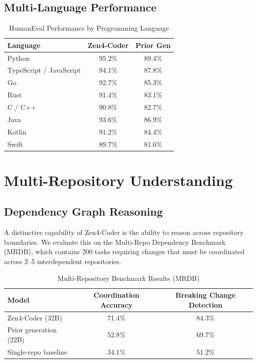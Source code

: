 \documentclass[11pt,a4paper]{article}
\begin{document}
\subsection{Multi-Language Performance}

\begin{table}[H]
\centering
\caption{HumanEval Performance by Programming Language}
\begin{tabular}{lcc}
\toprule
\textbf{Language} & \textbf{Zen4-Coder} & \textbf{Prior Gen} \\
\midrule
Python & 95.2\% & 89.4\% \\
TypeScript / JavaScript & 94.1\% & 87.8\% \\
Go & 92.7\% & 85.3\% \\
Rust & 91.4\% & 83.1\% \\
C / C++ & 90.8\% & 82.7\% \\
Java & 93.6\% & 86.9\% \\
Kotlin & 91.2\% & 84.4\% \\
Swift & 89.7\% & 81.6\% \\
\bottomrule
\end{tabular}
\end{table}

\section{Multi-Repository Understanding}

\subsection{Dependency Graph Reasoning}

A distinctive capability of Zen4-Coder is the ability to reason across repository boundaries. We evaluate this on the Multi-Repo Dependency Benchmark (MRDB), which contains 200 tasks requiring changes that must be coordinated across 2--5 interdependent repositories.

\begin{table}[H]
\centering
\caption{Multi-Repository Benchmark Results (MRDB)}
\begin{tabular}{lcc}
\toprule
\textbf{Model} & \textbf{Coordination Accuracy} & \textbf{Breaking Change Detection} \\
\midrule
Zen4-Coder (32B) & 71.4\% & 84.3\% \\
Prior generation (22B) & 52.8\% & 69.7\% \\
Single-repo baseline & 34.1\% & 51.2\% \\
\bottomrule
\end{tabular}
\end{table}
\end{document}
